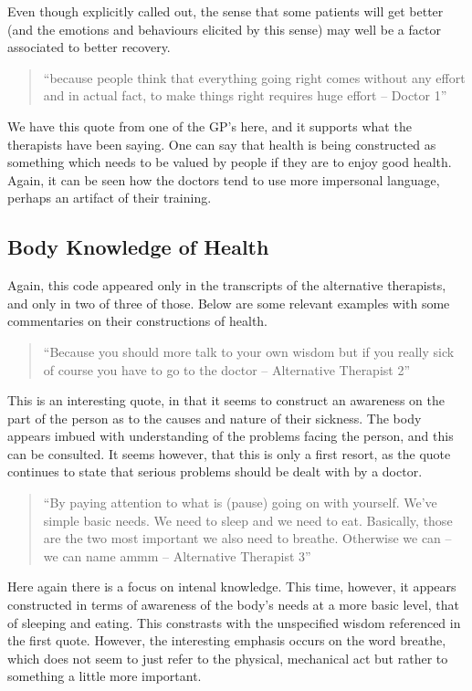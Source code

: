 Even though explicitly called out, the sense that some patients will get better (and the emotions and behaviours elicited by this sense) may well be a factor associated to better recovery. 

\begin{quotation}
``because people think that everything going right comes without any effort and in actual fact, to make things right requires huge effort – Doctor 1''  
\end{quotation}


We have this quote from one of the GP's here, and it supports what the therapists have been saying. One can say that health is being constructed as something which needs to be valued by people if they are to enjoy good health. Again, it can be seen how the doctors tend to use more impersonal language, perhaps an artifact of their training. 

\subsection{Body Knowledge of Health}

Again, this code appeared only in the transcripts of the alternative therapists, and only in two of three of those. Below are some relevant examples with some commentaries on their constructions of health. 

\begin{quotation}
``Because you should more talk to your own wisdom but if you really sick of course you have to go to the doctor – Alternative Therapist 2''  
\end{quotation}


This is an interesting quote, in that it seems to construct an awareness on the part of the person as to the causes and nature of their sickness. The body appears imbued with understanding of the problems facing the person, and this can be consulted. It seems however, that this is only a first resort, as the quote continues to state that serious problems should be dealt with by a doctor.

\begin{quotation}
``By paying attention to what is (pause) going on with yourself. We've simple basic needs. We need to sleep and we need to eat. Basically, those are the two most important we also need to breathe. Otherwise we can – we can name ammm – Alternative Therapist 3''  
\end{quotation}


Here again there is a focus on intenal knowledge. This time, however, it appears constructed in terms of awareness of the body's needs at a more basic level, that of sleeping and eating. This constrasts with the unspecified wisdom referenced in the first quote. However, the interesting emphasis occurs on the word breathe, which does not seem to just refer to the physical, mechanical act but rather to something a little more important. 


